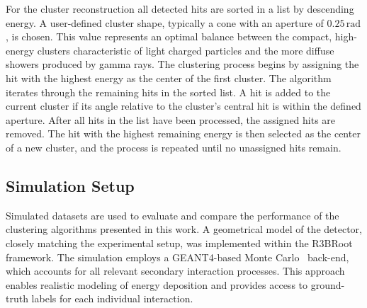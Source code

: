 \documentclass[review,sort&compress]{elsarticle}
\begin{document}
For the cluster reconstruction all detected hits are sorted in a list by descending energy. A user-defined cluster shape, typically a cone with an aperture of $0.25\,\mathrm{rad}$, is chosen. This value represents an optimal balance between the compact, high-energy clusters characteristic of light charged particles and the more diffuse showers produced by gamma rays.\newline 
The clustering process begins by assigning the hit with the highest energy as the center of the first cluster. The algorithm iterates through the remaining hits in the sorted list. A hit is added to the current cluster if its angle relative to the cluster's central hit is within the defined aperture. After all hits in the list have been processed, the assigned hits are removed. The hit with the highest remaining energy is then selected as the center of a new cluster, and the process is repeated until no unassigned hits remain.\newline

\subsection{Simulation Setup}\label{s_sec:data_sim}
Simulated datasets are used to evaluate and compare the performance of the clustering algorithms presented in this work.
A geometrical model of the detector, closely matching the experimental setup, was implemented within the R3BRoot framework. The simulation employs a GEANT4-based Monte Carlo~\cite{agostinelli2003geant4} back-end, which accounts for all relevant secondary interaction processes. This approach enables realistic modeling of energy deposition and provides access to ground-truth labels for each individual interaction.\newline
\end{document}
